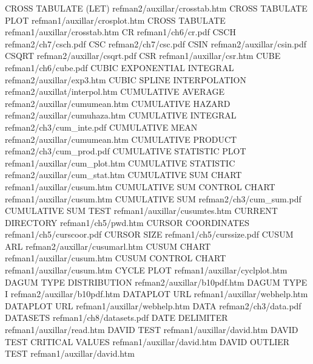 CROSS TABULATE (LET)                    refman2/auxillar/crosstab.htm
CROSS TABULATE PLOT                     refman1/auxillar/crosplot.htm
CROSS TABULATE                          refman1/auxillar/crosstab.htm
CR                                      refman1/ch6/cr.pdf
CSCH                                    refman2/ch7/csch.pdf
CSC                                     refman2/ch7/csc.pdf
CSIN                                    refman2/auxillar/csin.pdf
CSQRT                                   refman2/auxillar/csqrt.pdf
CSR                                     refman1/auxillar/csr.htm
CUBE                                    refman1/ch6/cube.pdf
CUBIC EXPONENTIAL INTEGRAL              refman2/auxillar/exp3.htm
CUBIC SPLINE INTERPOLATION              refman2/auxillat/interpol.htm
CUMULATIVE AVERAGE                      refman2/auxillar/cumumean.htm
CUMULATIVE HAZARD                       refman2/auxillar/cumuhaza.htm
CUMULATIVE INTEGRAL                     refman2/ch3/cum_inte.pdf
CUMULATIVE MEAN                         refman2/auxillar/cumumean.htm
CUMULATIVE PRODUCT                      refman2/ch3/cum_prod.pdf
CUMULATIVE STATISTIC PLOT               refman1/auxillar/cum_plot.htm
CUMULATIVE STATISTIC                    refman2/auxillar/cum_stat.htm
CUMULATIVE SUM CHART                    refman1/auxillar/cusum.htm
CUMULATIVE SUM CONTROL CHART            refman1/auxillar/cusum.htm
CUMULATIVE SUM                          refman2/ch3/cum_sum.pdf
CUMULATIVE SUM TEST                     refman1/auxillar/cusumtes.htm
CURRENT DIRECTORY                       refman1/ch5/pwd.htm
CURSOR COORDINATES                      refman1/ch5/curscoor.pdf
CURSOR SIZE                             refman1/ch5/curssize.pdf
CUSUM ARL                               refman2/auxillar/cusumarl.htm
CUSUM CHART                             refman1/auxillar/cusum.htm
CUSUM CONTROL CHART                     refman1/auxillar/cusum.htm
CYCLE PLOT                              refman1/auxillar/cyclplot.htm
DAGUM TYPE DISTRIBUTION                 refman2/auxillar/b10pdf.htm
DAGUM TYPE I                            refman2/auxillar/b10pdf.htm
DATAPLOT URL                            refman1/auxillar/webhelp.htm
DATAPLOT URL                            refman1/auxillar/webhelp.htm
DATA                                    refman2/ch3/data.pdf
DATASETS                                refman1/ch8/datasets.pdf
DATE DELIMITER                          refman1/auxillar/read.htm
DAVID TEST                              refman1/auxillar/david.htm
DAVID TEST CRITICAL VALUES              refman1/auxillar/david.htm
DAVID OUTLIER TEST                      refman1/auxillar/david.htm
